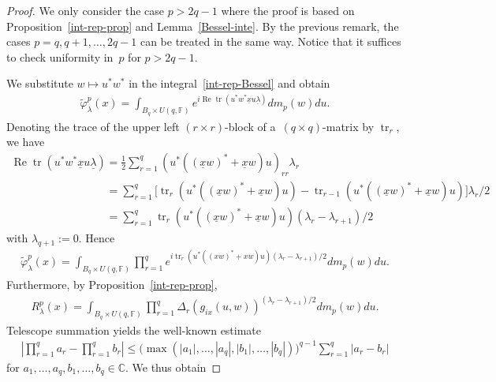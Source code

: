 \documentclass[11pt]{article}
\numberwithin{equation}{section}
\DeclareMathOperator{\Ree}{Re}
\begin{document}
\begin{proof}
We only consider the case $p>2q-1$ where the proof is based on Proposition~\ref{int-rep-prop} and
Lemma~\ref{Bessel-inte}.
By the previous remark, the cases $p={q,q+1,\ldots,2q-1}$ can be treated in the same way.
Notice that it suf\/f\/ices to check uniformity in~$p$ for $p>2q-1$.

We substitute $w\mapsto u^*w^*$ in the integral~\eqref{int-rep-Bessel} and obtain
\begin{gather*}
\widetilde\varphi_\lambda^{p}(x)= \int_{B_q\times U(q, \mathbb F)} e^{i \Ree \operatorname{tr}(u^* w^*\underline x u\underline \lambda )}dm_p(w)du.
\end{gather*}
Denoting the trace of the upper left $(r\times r)$-block of a~$(q\times q)$-matrix by $\operatorname{tr}_r$, we have
\begin{gather*}
\Ree \operatorname{tr}(u^* w^*\underline x u\underline\lambda)
=\frac{1}{2} \sum\limits_{r=1}^q (u^*((\underline x w)^*+\underline x w)u)_{rr}  \lambda_r
\\
\phantom{\Ree \operatorname{tr}(u^* w^*\underline x u\underline\lambda)}{}
=\sum\limits_{r=1}^q \bigl[ \operatorname{tr}_r(u^*((\underline xw)^*+\underline xw)u) - \operatorname{tr}_{r-1}(u^*((\underline xw)^*+\underline xw)u)\bigr]   \lambda_r/2
\\
\phantom{\Ree \operatorname{tr}(u^* w^*\underline x u\underline\lambda)}{}
=\sum\limits_{r=1}^q \operatorname{tr}_r(u^*((\underline xw)^*+ \underline xw)u)  (\lambda_r-\lambda_{r+1})/2
\end{gather*}
with $\lambda_{q+1}:=0$.
Hence
\begin{gather*}
\widetilde\varphi_\lambda^{p}(x)
=\int_{B_q\times U(q,\mathbb F)} \prod\limits_{r=1}^q e^{i  \operatorname{tr}_r(u^*((xw)^*+xw)u) (\lambda_r-\lambda_{r+1})/2} dm_p(w)du.
\end{gather*}
Furthermore, by Proposition~\ref{int-rep-prop},
\begin{gather*}
R_{\lambda}^p(x)=\int_{B_q\times U(q,\mathbb F)} \prod\limits_{r=1}^q\Delta_r(g_{ix}(u,w))^{(\lambda_r-\lambda_{r+1})/2} dm_p(w)du.
\end{gather*}
Telescope summation yields the well-known estimate
\begin{gather*}
\left|\prod\limits_{r=1}^q a_r
-\prod\limits_{r=1}^q b_r\right|\le\big(\max(|a_1|,\ldots,|a_q|,|b_1|,\ldots, |b_q|)\big)^{q-1}  \sum\limits_{r=1}^q|a_r-b_r|
\end{gather*}
for $a_1,\ldots,a_q,b_1,\ldots,b_q\in \mathbb C$.
We thus obtain

\end{proof}
\end{document}
